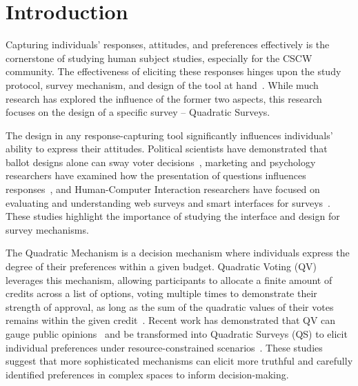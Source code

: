 \section{Introduction}
Capturing individuals' responses, attitudes, and preferences effectively is the cornerstone of studying human subject studies, especially for the CSCW community. The effectiveness of eliciting these responses hinges upon the study protocol, survey mechanism, and design of the tool at hand~\cite{olsonWaysKnowingHCI2014, couperWebSurveyDesign2001, jackoHumancomputerInteractionHandbook2012}. While much research has explored the influence of the former two aspects, this research focuses on the design of a specific survey -- Quadratic Surveys.

The design in any response-capturing tool significantly influences individuals' ability to express their attitudes. Political scientists have demonstrated that ballot designs alone can sway voter decisions~\cite{engstrom2020politics}, marketing and psychology researchers have examined how the presentation of questions influences responses~\cite{weijtersEffectRatingScale2010, kierujVariationsResponseStyle2010, toepoelSmileysStarsHearts2019}, and Human-Computer Interaction researchers have focused on evaluating and understanding web surveys and smart interfaces for surveys~\cite{farzandAestheticsEvaluatingResponse2024, xiaoTellMeYourself2020, pielotDidYouMisclick2024}. These studies highlight the importance of studying the interface and design for survey mechanisms.

The Quadratic Mechanism is a decision mechanism where individuals express the degree of their preferences within a given budget. Quadratic Voting (QV) leverages this mechanism, allowing participants to allocate a finite amount of credits across a list of options, voting multiple times to demonstrate their strength of approval, as long as the sum of the quadratic values of their votes remains within the given credit~\cite{lalley2018quadratic}. Recent work has demonstrated that QV can gauge public opinions~\cite{quarfoot2017quadratic} and be transformed into Quadratic Surveys (QS) to elicit individual preferences under resource-constrained scenarios~\cite{chengCanShowWhat2021}. These studies suggest that more sophisticated mechanisms can elicit more truthful and carefully identified preferences in complex spaces to inform decision-making.

